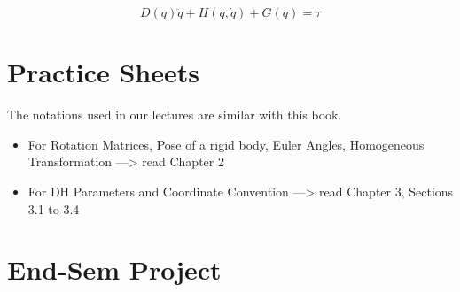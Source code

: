\documentclass[11pt]{report}
\begin{document}
$$D(q) \ddot{q} + H(q,\dot{q}) + G(q) = \tau$$
\part{Practice Sheets}
\label{sec:orgf440b7d}
The notations used in our lectures are similar with this book.

\begin{itemize}
\item For Rotation Matrices, Pose of a rigid body, Euler Angles, Homogeneous Transformation ---> read Chapter 2
\item For DH Parameters and Coordinate Convention ---> read Chapter 3, Sections 3.1 to 3.4
\end{itemize}
\part{End-Sem Project}
\label{sec:org91ddd99}
\end{document}
